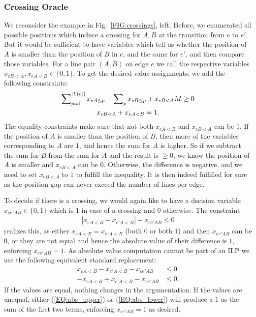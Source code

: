\documentclass[format=acmsmall, review=false, screen=true]{acmart}
\begin{document}
\subsubsection{Crossing Oracle}
We reconsider the example in Fig.~\ref{FIG:crossings}, left. Before, we enumerated all possible positions which induce a crossing for $A, B$ at the transition from $e$ to $e'$. But it would be sufficient to have variables which tell us whether the position of $A$ is smaller than the position of $B$ in $e$, and the same for $e'$, and then compare those variables. For a line pair $(A,B)$ on edge $e$ we call the respective variables $x_{eB<A}, x_{eA<B} \in \{0, 1\}$. %
To get the desired value assignments, we add the following constraints:
\begin{gather}
	\sum\nolimits_{p=1}^{\left|L\left(e\right)\right|} x_{eA\leq p} - \sum\nolimits_{p} x_{eB\leq p} + x_{eB<A} M \geq 0 \\
	x_{eB<A} + x_{eA<B}=1.
\end{gather}
The equality constraints make sure that not both $x_{eA<B}$ and $x_{eB<A}$ can be $1$. If the position of $A$ is smaller than the position of $B$, then more of the variables corresponding to $A$ are $1$, and hence the sum for $A$ is higher. So if we subtract the sum for $B$ from the sum for $A$ and the result is $\geq 0$, we know the position of $A$ is smaller and $x_{eB<A}$ can be $0$. Otherwise, the difference is negative, and we need to set $x_{eB<A}$ to $1$ to fulfill the inequality. It is then indeed fulfilled for sure as the position gap can never exceed the number of lines per edge.

To decide if there is a crossing, we would again like to have a decision variable $x_{ee'AB} \in \{0,1\}$ which is $1$ in case of a crossing and $0$ otherwise. The constraint
\begin{gather}
	\left|x_{eA<B}-x_{e'A<B}\right| - x_{ee'AB} \leq 0
\end{gather}
realizes this, as either $x_{eA<B} = x_{e'A<B}$ (both $0$ or both $1$) and then $x_{ee'AB}$ can be $0$, or they are not equal and hence the absolute value of their difference is $1$, enforcing $x_{ee'AB}=1$. As absolute value computation cannot be part of an ILP we use the following equivalent standard replacement:
\begin{align}
	x_{eA<B} - x_{e'A<B} - x_{ee'AB} &\leq 0 \label{EQ:abs_upper}\\
	-x_{eA<B} + x_{e'A<B} - x_{ee'AB} &\leq 0. \label{EQ:abs_lower}
\end{align}
If the values are equal, nothing changes in the argumentation. If the values are unequal, either (\ref{EQ:abs_upper}) or (\ref{EQ:abs_lower})  will produce a $1$ as the sum of the first two terms, enforcing $x_{ee'AB}=1$ as desired.
\end{document}
